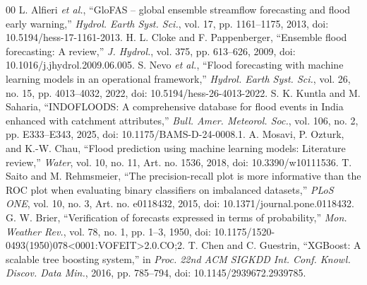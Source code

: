 \documentclass[conference]{IEEEtran}
\begin{document}
\begin{thebibliography}{00}
 L. Alfieri \textit{et al.}, ``GloFAS -- global ensemble streamflow forecasting and flood early warning,'' \textit{Hydrol. Earth Syst. Sci.}, vol. 17, pp. 1161--1175, 2013, doi: 10.5194/hess-17-1161-2013.
 H. L. Cloke and F. Pappenberger, ``Ensemble flood forecasting: A review,'' \textit{J. Hydrol.}, vol. 375, pp. 613--626, 2009, doi: 10.1016/j.jhydrol.2009.06.005.
 S. Nevo \textit{et al.}, ``Flood forecasting with machine learning models in an operational framework,'' \textit{Hydrol. Earth Syst. Sci.}, vol. 26, no. 15, pp. 4013--4032, 2022, doi: 10.5194/hess-26-4013-2022.
 S. K. Kuntla and M. Saharia, ``INDOFLOODS: A comprehensive database for flood events in India enhanced with catchment attributes,'' \textit{Bull. Amer. Meteorol. Soc.}, vol. 106, no. 2, pp. E333--E343, 2025, doi: 10.1175/BAMS-D-24-0008.1.
 A. Mosavi, P. Ozturk, and K.-W. Chau, ``Flood prediction using machine learning models: Literature review,'' \textit{Water}, vol. 10, no. 11, Art. no. 1536, 2018, doi: 10.3390/w10111536.
 T. Saito and M. Rehmsmeier, ``The precision-recall plot is more informative than the ROC plot when evaluating binary classifiers on imbalanced datasets,'' \textit{PLoS ONE}, vol. 10, no. 3, Art. no. e0118432, 2015, doi: 10.1371/journal.pone.0118432.
 G. W. Brier, ``Verification of forecasts expressed in terms of probability,'' \textit{Mon. Weather Rev.}, vol. 78, no. 1, pp. 1--3, 1950, doi: 10.1175/1520-0493(1950)078\textless{}0001:VOFEIT\textgreater{}2.0.CO;2.
 T. Chen and C. Guestrin, ``XGBoost: A scalable tree boosting system,'' in \textit{Proc. 22nd ACM SIGKDD Int. Conf. Knowl. Discov. Data Min.}, 2016, pp. 785--794, doi: 10.1145/2939672.2939785.
\end{thebibliography}
\end{document}
